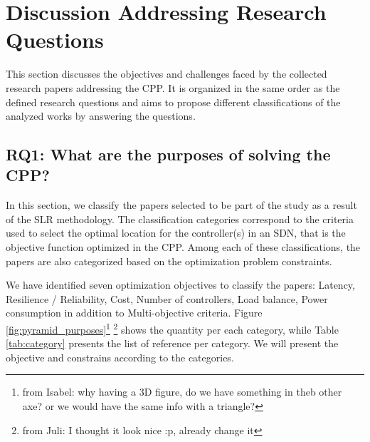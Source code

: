 \documentclass{IEEEtran}
\newcommand\fia[1]{{\color{red}\footnote{\color{red}from Isabel: #1}}} %
\newcommand\juli[1]{{\color{magenta}\footnote{\color{magenta}from Juli: #1}}}
\begin{document}

\section{Discussion Addressing Research Questions}

This section discusses the objectives and challenges faced by the collected research papers addressing the CPP. It is organized in the same order as the defined research questions and aims to propose different classifications of the analyzed works by answering the questions.

\subsection {RQ1: What are the purposes of solving the CPP?}

In this section, we classify the papers selected to be part of the study as a result of the SLR methodology. The classification categories correspond to the criteria used to select the optimal location for the controller(s) in an SDN, that is the objective function optimized in the CPP. Among each of these classifications, the papers are also categorized based on the optimization problem constraints.

We have identified seven optimization objectives to classify the papers: Latency, Resilience / Reliability, Cost, Number of controllers, Load balance, Power  consumption in addition to Multi-objective criteria. Figure \ref{fig:pyramid_purposes}\fia{why having a 3D figure, do we have something in theb other axe? or we would have the same info with a triangle?} \juli{I thought it look nice :p, already change it} shows the quantity per each category, while Table \ref{tab:category} presents the list of reference per category. We will present the objective and constrains according to the categories.
\end{document}

